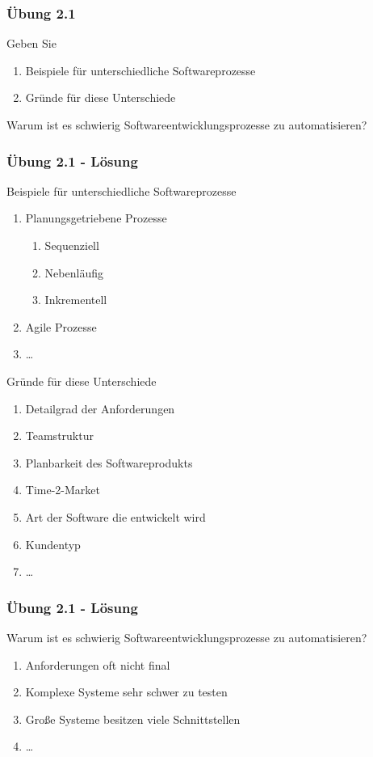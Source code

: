 \begin{frame}
\frametitle{Übung 2.1}
	Geben Sie
	\begin{enumerate}
		\item Beispiele für unterschiedliche Softwareprozesse
		\item Gründe für diese Unterschiede
	\end{enumerate}
	Warum ist es schwierig Softwareentwicklungsprozesse zu automatisieren?
\end{frame}

\ifloesung
\begin{frame}
\frametitle{Übung 2.1 - Lösung}
	\scriptsize
	Beispiele für unterschiedliche Softwareprozesse
	\begin{enumerate}
		\item Planungsgetriebene Prozesse
		\begin{enumerate}
			\scriptsize
			\item Sequenziell
			\item Nebenläufig
			\item Inkrementell
		\end{enumerate}
		\item Agile Prozesse
		\item \ldots
	\end{enumerate}
	\bigskip
	Gründe für diese Unterschiede
	\begin{enumerate}
		\item Detailgrad der Anforderungen
		\item Teamstruktur
		\item Planbarkeit des Softwareprodukts
		\item Time-2-Market
		\item Art der Software die entwickelt wird
		\item Kundentyp
		\item \ldots
	\end{enumerate}
	\normalsize
\end{frame}

\begin{frame}
\frametitle{Übung 2.1 - Lösung}
	\scriptsize
	Warum ist es schwierig Softwareentwicklungsprozesse zu automatisieren?
	\begin{enumerate}
		\item Anforderungen oft nicht final
		\item Komplexe Systeme sehr schwer zu testen
		\item Große Systeme besitzen viele Schnittstellen
		\item \ldots
	\end{enumerate}
	\normalsize
\end{frame}
\fi

